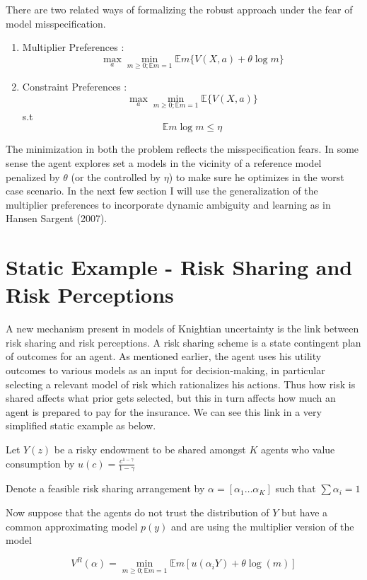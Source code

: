 \documentclass[12pt]{article}
\begin{document}
There are two related ways of formalizing the robust approach under the fear of model misspecification. 
\begin{enumerate}
	\item Multiplier Preferences : \[\max_{a}\min_{m\geq 0; \mathbb{E}m=1} \mathbb{E}m\{V(X,a) + \theta \log m \}\]
	\item Constraint Preferences : \[\max_{a}\min_{m\geq 0; \mathbb{E}m=1} \mathbb{E}\{V(X,a) \}\]
	s.t 
	\[\mathbb{E}m\log m \leq \eta\]
	
\end{enumerate}
The minimization in both the problem reflects the misspecification fears. In some sense the agent explores set a models in the vicinity of a reference model penalized by $\theta$ (or the controlled by $\eta$) to make sure he optimizes in the worst case scenario. In the next few section I will use the generalization of the multiplier preferences to incorporate dynamic ambiguity and learning as in Hansen Sargent (2007).
	
\section{Static Example - Risk Sharing and Risk Perceptions}
A new mechanism present in models of Knightian uncertainty is the link between risk sharing and risk perceptions. A risk sharing scheme is a state contingent plan of outcomes for an agent. As mentioned earlier, the agent uses his utility outcomes to various models as an input for decision-making, in particular selecting a relevant model of risk which rationalizes his actions. Thus how risk is shared affects what prior gets selected, but this in turn affects how much an agent is prepared to pay for the insurance. We can see this link in a very simplified static example as below.
\vspace{10 mm}

\noindent Let $Y(z)$ be a risky endowment to be shared amongst $K$ agents who value consumption by $u(c)=\frac{c^{1-\gamma}}{1-\gamma}$

\noindent  Denote a feasible risk sharing arrangement by $\alpha = [\alpha_1 \dots \alpha_K]$ such that $\sum \alpha_i=1$

\noindent  Now suppose that the agents do not trust the distribution of $Y$ but have a common approximating model $p(y)$ and are using the multiplier version of the model

\[V^R (\alpha)=\min_{m \geq0;\mathbb{E}m=1}\mathbb{E}m[u(\alpha_iY)+\theta\log(m)]\]
\end{document}
